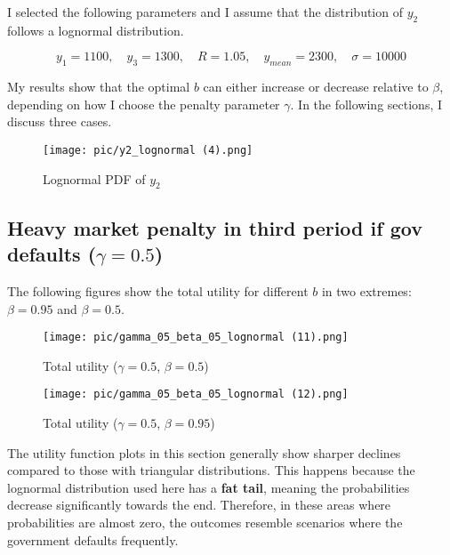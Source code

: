 \documentclass{article}
\begin{document}
I selected the following parameters and I assume that the distribution of $y_2$ follows a lognormal distribution.

$$y_1 = 1100, \quad y_3 = 1300, \quad R=1.05, \quad y_{mean} = 2300, \quad \sigma = 10000 $$

My results show that the optimal $b$ can either increase or decrease relative to $\beta$, depending on how I choose the penalty parameter $\gamma$. In the following sections, I discuss three cases.

\begin{figure}[H]
\centering
{\texttt{[image: pic/y2\_lognormal (4).png]}}
\caption{Lognormal PDF of $y_2$}
\end{figure}

\subsection{Heavy market penalty in third period if gov defaults ($\gamma = 0.5$)}

The following figures show the total utility for different $b$ in two extremes: $\beta = 0.95$ and $\beta = 0.5$. 


\begin{figure}[H]
    \centering
    \begin{minipage}{0.5\textwidth}
        \centering
        \texttt{[image: pic/gamma\_05\_beta\_05\_lognormal (11).png]}
        \caption{Total utility ($\gamma = 0.5$, $\beta = 0.5$)}
        \label{fig:gamma05beta05}
    \end{minipage}\hfill
    \begin{minipage}{0.5\textwidth}
        \centering
        \texttt{[image: pic/gamma\_05\_beta\_05\_lognormal (12).png]}
        \caption{Total utility ($\gamma = 0.5$, $\beta = 0.95$)}
        \label{fig:gamma05beta095}
    \end{minipage}
\end{figure}

The utility function plots in this section generally show sharper declines compared to those with triangular distributions. This happens because the lognormal distribution used here has a \textbf{fat tail}, meaning the probabilities decrease significantly towards the end. Therefore, in these areas where probabilities are almost zero, the outcomes resemble scenarios where the government defaults frequently.
\end{document}
